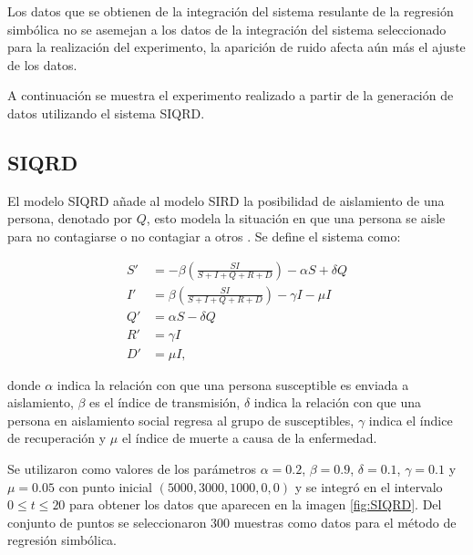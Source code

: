 Los datos que se obtienen de la integración del sistema resulante de la regresión simbólica no se asemejan a los datos de la integración del sistema seleccionado para la realización del experimento, la aparición de ruido afecta aún más el ajuste de los datos.

A continuación se muestra el experimento realizado a partir de la generación de datos utilizando el sistema SIQRD.

\subsection{SIQRD}

El modelo SIQRD añade al modelo SIRD la posibilidad de aislamiento de una persona, denotado por $Q$, esto modela la situación en que una persona se aisle para no contagiarse o no contagiar a otros \cite{molter2021mathematical}. Se define el sistema como:

\begin{align*}
    S' & = -\beta (\frac{S I}{S + I + Q + R + D}) - \alpha S + \delta Q \\
    I' & = \beta (\frac{S I}{S + I + Q + R + D}) - \gamma I - \mu I     \\
    Q' & = \alpha S - \delta Q                                          \\
    R' & = \gamma I                                                     \\
    D' & = \mu I,
\end{align*}

donde $\alpha$ indica la relación con que una persona susceptible es enviada a aislamiento, $\beta$ es el índice de transmisión, $\delta$ indica la relación con que una persona en aislamiento social regresa al grupo de susceptibles, $\gamma$ indica el índice de recuperación y $\mu$ el índice de muerte a causa de la enfermedad.

Se utilizaron como valores de los parámetros $\alpha = 0.2$, $\beta = 0.9$, $\delta = 0.1$, $\gamma = 0.1$ y $\mu = 0.05$ con punto inicial $(5000, 3000, 1000, 0, 0)$ y se integró en el intervalo $0 \leq t \leq 20$ para obtener los datos que aparecen en la imagen \ref{fig:SIQRD}. Del conjunto de puntos se seleccionaron 300 muestras como datos para el método de regresión simbólica.

